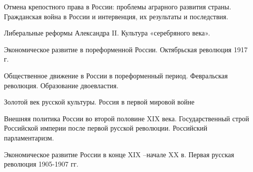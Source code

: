 \documentclass[
	14pt,
	a4paper,
	]
	{scrartcl}
\begin{document}
\vfill

\newpage


\shapk
{}
\setcounter{zad}{0}

\vfill
\z 	Отмена крепостного права в России: проблемы аграрного развития страны.
 \vfill
\z 	Гражданская война в России и интервенция, их результаты и последствия.
 \vfill

\vfill

\newpage


\shapk
{}
\setcounter{zad}{0}

\vfill
\z 	Либеральные реформы Александра II.
 \vfill
\z 	Культура «серебряного века».
 \vfill

\vfill

\newpage


\shapk
{}
\setcounter{zad}{0}

\vfill
\z 	Экономическое развитие в пореформенной России.
 \vfill
\z 	Октябрьская революция 1917 г.
 \vfill

\vfill

\newpage


\shapk
{}
\setcounter{zad}{0}

\vfill
\z 	Общественное движение в России в пореформенный период.
 \vfill
\z 	Февральская революция. Образование двоевластия.
 \vfill

\vfill

\newpage


\shapk
{}
\setcounter{zad}{0}

\vfill
\z 	Золотой век русской культуры.
 \vfill
\z 	Россия в первой мировой войне
 \vfill

\vfill

\newpage


\shapk
{}
\setcounter{zad}{0}

\vfill
\z 	Внешняя политика России во второй половине XIX века.
 \vfill
\z 	Государственный строй Российской империи после первой русской революции. Российский парламентаризм. 
 \vfill

\vfill

\newpage


\shapk
{}
\setcounter{zad}{0}

\vfill
\z 	Экономическое развитие России в конце XIX –начале XX в.
 \vfill
\z 	Первая русская революция 1905-1907 гг.
 \vfill

\vfill

\newpage
\end{document}
